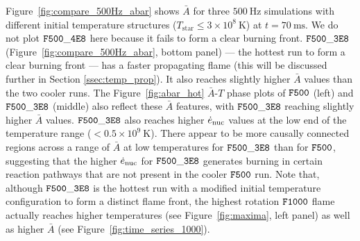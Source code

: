 \documentclass[preprint,times,tighten]{aastex63}
\newcommand{\enucdot}{\dot{e}_{\rm nuc}}
\begin{document}
Figure~\ref{fig:compare_500Hz_abar} shows $\bar{A}$ for three $500~\mathrm{Hz}$ simulations with different initial temperature structures ($T_{\mathrm{star}} \leq 3 \times 10^8~\mathrm{K}$) at $t = 70~\mathrm{ms}$. We do not plot $\tt{F500\_4E8}$ here because it fails to form a clear burning front. $\tt{F500\_3E8}$ (Figure~\ref{fig:compare_500Hz_abar}, bottom panel) --- the hottest run to form a clear burning front --- has a faster propagating flame (this will be discussed further in Section \ref{ssec:temp_prop}). It also reaches slightly higher $\bar{A}$ values than the two cooler runs. The Figure~\ref{fig:abar_hot} $\bar{A}$-$T$ phase plots of $\tt{F500}$ (left) and $\tt{F500\_3E8}$ (middle) also reflect these $\bar{A}$ features, with $\tt{F500\_3E8}$ reaching slightly higher $\bar{A}$ values. $\tt{F500\_3E8}$ also reaches higher $\enucdot$ values at the low end of the temperature range ($< 0.5 \times 10^9~\mathrm{K}$). There appear to be more causally connected regions across a range of $\bar{A}$ at low temperatures for $\tt{F500\_3E8}$ than for $\tt{F500}$, suggesting that the higher $\enucdot$ for $\tt{F500\_3E8}$ generates burning in certain reaction pathways that are not present in the cooler $\tt{F500}$ run. Note that, although $\tt{F500\_3E8}$ is the hottest run with a modified initial temperature configuration to form a distinct flame front, the highest rotation $\tt{F1000}$ flame actually reaches higher temperatures (see Figure~\ref{fig:maxima}, left panel) as well as higher $\bar{A}$ (see Figure~\ref{fig:time_series_1000}).
\end{document}

